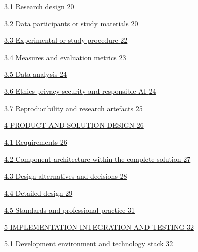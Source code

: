 \documentclass[
]{article}
\begin{document}
\protect\hyperlink{research-design}{3.1 Research design
\protect\hyperlink{research-design}{20}}

\protect\hyperlink{data-participants-or-study-materials}{3.2 Data
participants or study materials
\protect\hyperlink{data-participants-or-study-materials}{20}}

\protect\hyperlink{experimental-or-study-procedure}{3.3 Experimental or
study procedure \protect\hyperlink{experimental-or-study-procedure}{22}}

\protect\hyperlink{measures-and-evaluation-metrics}{3.4 Measures and
evaluation metrics
\protect\hyperlink{measures-and-evaluation-metrics}{23}}

\protect\hyperlink{data-analysis}{3.5 Data analysis
\protect\hyperlink{data-analysis}{24}}

\protect\hyperlink{ethics-privacy-security-and-responsible-ai}{3.6
Ethics privacy security and responsible AI
\protect\hyperlink{ethics-privacy-security-and-responsible-ai}{24}}

\protect\hyperlink{reproducibility-and-research-artefacts}{3.7
Reproducibility and research artefacts
\protect\hyperlink{reproducibility-and-research-artefacts}{25}}

\protect\hyperlink{product-and-solution-design}{4 PRODUCT AND SOLUTION
DESIGN \protect\hyperlink{product-and-solution-design}{26}}

\protect\hyperlink{requirements}{4.1 Requirements
\protect\hyperlink{requirements}{26}}

\protect\hyperlink{component-architecture-within-the-complete-solution}{4.2
Component architecture within the complete solution
\protect\hyperlink{component-architecture-within-the-complete-solution}{27}}

\protect\hyperlink{design-alternatives-and-decisions}{4.3 Design
alternatives and decisions
\protect\hyperlink{design-alternatives-and-decisions}{28}}

\protect\hyperlink{detailed-design}{4.4 Detailed design
\protect\hyperlink{detailed-design}{29}}

\protect\hyperlink{standards-and-professional-practice}{4.5 Standards
and professional practice
\protect\hyperlink{standards-and-professional-practice}{31}}

\protect\hyperlink{implementation-integration-and-testing}{5
IMPLEMENTATION INTEGRATION AND TESTING
\protect\hyperlink{implementation-integration-and-testing}{32}}

\protect\hyperlink{development-environment-and-technology-stack}{5.1
Development environment and technology stack
\protect\hyperlink{development-environment-and-technology-stack}{32}}
\end{document}
